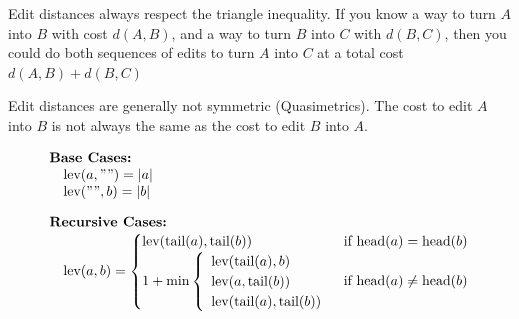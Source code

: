 \documentclass{article}
\begin{document}
Edit distances always respect the triangle inequality. If you know a way to turn $A$ into $B$ with cost $d(A,B)$, and a way to turn $B$ into $C$ with $d(B,C)$, then you could do both sequences of edits to turn $A$ into $C$ at a total cost $d(A,B) + d(B,C)$

Edit distances are generally not symmetric (Quasimetrics). The cost to edit $A$ into $B$ is not always the same as the cost to edit $B$ into $A$.

\[
\begin{array}{ll}
\textbf{Base Cases:} \\
\quad \text{lev}(a, "") = |a| \\
\quad \text{lev}("", b) = |b| \\[1em]
\textbf{Recursive Cases:} \\
\quad \text{lev}(a, b) =
  \begin{cases}
    \text{lev}(\text{tail}(a), \text{tail}(b)) & \text{if } \text{head}(a) = \text{head}(b) \\
    1 + \min\left\{
      \begin{array}{l}
        \text{lev}(\text{tail}(a), b) \\
        \text{lev}(a, \text{tail}(b)) \\
        \text{lev}(\text{tail}(a), \text{tail}(b))
      \end{array}
    \right. & \text{if } \text{head}(a) \neq \text{head}(b)
  \end{cases}
\end{array}
\]
\end{document}
